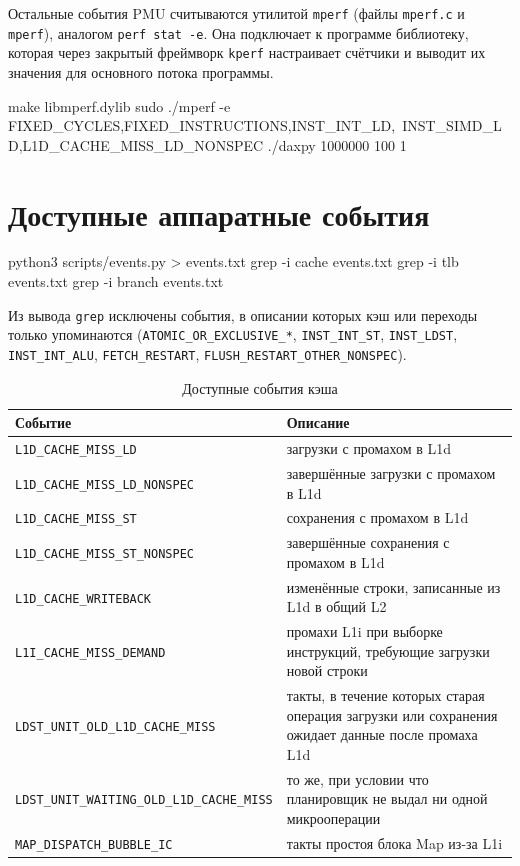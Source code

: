 Остальные события PMU считываются утилитой \texttt{mperf} (файлы \texttt{mperf.c} и \texttt{mperf}), аналогом \texttt{perf stat -e}.
Она подключает к программе библиотеку, которая через закрытый фреймворк \texttt{kperf} настраивает счётчики и выводит их значения для основного потока программы.

\begin{commands}
make libmperf.dylib
sudo ./mperf -e FIXED_CYCLES,FIXED_INSTRUCTIONS,INST_INT_LD,\
INST_SIMD_LD,L1D_CACHE_MISS_LD_NONSPEC ./daxpy 1000000 100 1
\end{commands}

\section{Доступные аппаратные события}

\begin{commands}
python3 scripts/events.py > events.txt
grep -i cache events.txt
grep -i tlb events.txt
grep -i branch events.txt
\end{commands}


Из вывода \texttt{grep} исключены события, в описании которых кэш или переходы только упоминаются (\texttt{ATOMIC\_OR\_EXCLUSIVE\_*}, \texttt{INST\_INT\_ST}, \texttt{INST\_LDST}, \texttt{INST\_INT\_ALU}, \texttt{FETCH\_RESTART}, \texttt{FLUSH\_RESTART\_OTHER\_NONSPEC}).

\begin{table}[H]
\caption{Доступные события кэша}
\label{tab:events-cache}
\small
\begin{tabularx}{\textwidth}{|l|X|}
	\hline
	Событие & Описание \\
	\hline
	\texttt{L1D\_CACHE\_MISS\_LD} & загрузки с промахом в L1d \\
	\hline
	\texttt{L1D\_CACHE\_MISS\_LD\_NONSPEC} & завершённые загрузки с промахом в L1d \\
	\hline
	\texttt{L1D\_CACHE\_MISS\_ST} & сохранения с промахом в L1d \\
	\hline
	\texttt{L1D\_CACHE\_MISS\_ST\_NONSPEC} & завершённые сохранения с промахом в L1d \\
	\hline
	\texttt{L1D\_CACHE\_WRITEBACK} & изменённые строки, записанные из L1d в общий L2 \\
	\hline
	\texttt{L1I\_CACHE\_MISS\_DEMAND} & промахи L1i при выборке инструкций, требующие загрузки новой строки \\
	\hline
	\texttt{LDST\_UNIT\_OLD\_L1D\_CACHE\_MISS} & такты, в течение которых старая операция загрузки или сохранения ожидает данные после промаха L1d \\
	\hline
	\texttt{LDST\_UNIT\_WAITING\_OLD\_L1D\_CACHE\_MISS} & то же, при условии что планировщик не выдал ни одной микрооперации \\
	\hline
	\texttt{MAP\_DISPATCH\_BUBBLE\_IC} & такты простоя блока Map из-за L1i \\
	\hline
\end{tabularx}
\end{table}

